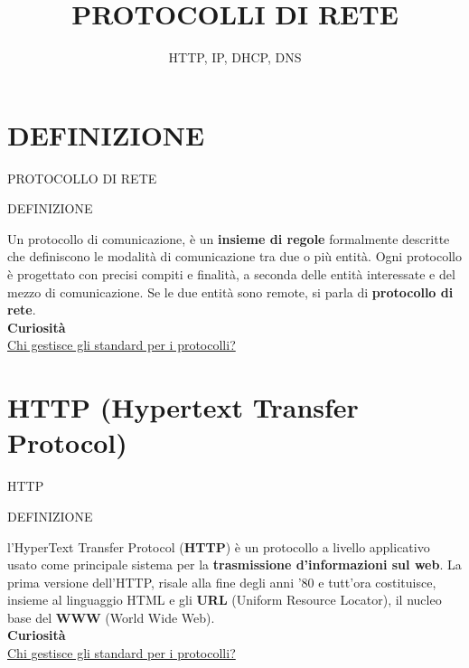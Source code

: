 \documentclass[aspectratio=1610, handout]{beamer}
\title{PROTOCOLLI DI RETE}
\subtitle{HTTP, IP, DHCP, DNS}
\date{}
\institute{\textit{
        Fonti:
        \begin{itemize}
            \item[-] \href{https://it.wikipedia.org/wiki/Protocollo_di_rete}{Wikipedia}
            \item[-] \href{https://www.forbes.com/advisor/it/business/software/ipv6-protocollo-vpn/}{Forbes}
        \end{itemize}
    }
}
\begin{document}
\begin{frame}
    \titlepage
\end{frame}

\section{DEFINIZIONE}

\begin{frame}{PROTOCOLLO DI RETE}
    \begin{alertblock}{DEFINIZIONE}
        \begin{minipage}{0.98\linewidth}
            \justifying
            Un protocollo di comunicazione, è un \textbf{insieme di regole} formalmente descritte 
            che definiscono le modalità di comunicazione tra due o più entità. Ogni protocollo 
            è progettato con precisi compiti e finalità, a seconda delle entità interessate e 
            del mezzo di comunicazione. Se le due entità sono remote, si parla di \textbf{protocollo di rete}.\\
            \bigskip
            \tiny{\textbf{Curiosità}}\\
            \tiny{\href{https://www.w3.org/}{Chi gestisce gli standard per i protocolli?}}           
        \end{minipage}
    \end{alertblock}
\end{frame}

\section{HTTP (Hypertext Transfer Protocol)}

\begin{frame}{HTTP}
    \begin{alertblock}{DEFINIZIONE}
        \begin{minipage}{0.98\linewidth}
            \justifying
            l'HyperText Transfer Protocol (\textbf{HTTP}) è un protocollo a livello applicativo 
            usato come principale sistema per la \textbf{trasmissione d'informazioni sul web}. La prima 
            versione dell'HTTP, risale alla fine degli anni '80 e tutt'ora costituisce, insieme al 
            linguaggio HTML e gli \textbf{URL} (Uniform Resource Locator), il nucleo base 
            del \textbf{WWW} (World Wide Web).\\
            \bigskip
            \tiny{\textbf{Curiosità}}\\
            \tiny{\href{https://www.w3.org/}{Chi gestisce gli standard per i protocolli?}}           
        \end{minipage}
    \end{alertblock}
\end{frame}
\end{document}
